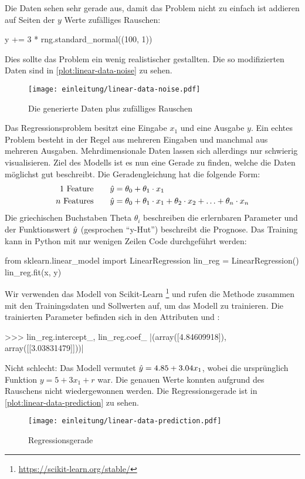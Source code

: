 \noindent
Die Daten sehen sehr gerade aus, damit das Problem nicht zu einfach ist
addieren auf Seiten der $y$ Werte zufälliges Rauschen:
\begin{pythoncode}
y += 3 * rng.standard_normal((100, 1))
\end{pythoncode}
Dies sollte das Problem ein wenig realistischer gestallten.
Die so modifizierten Daten sind in \autoref{plot:linear-data-noise} zu sehen.
\newpage
\begin{figure}[!h]
  \centering
  \texttt{[image: einleitung/linear-data-noise.pdf]}
  \caption{Die generierte Daten plus zufälliges Rauschen}
  \label{plot:linear-data-noise}
\end{figure}
\noindent
Das Regressionsproblem besitzt eine Eingabe $x_1$ und eine Ausgabe $y$.
Ein echtes Problem besteht in der Regel aus mehreren Eingaben und manchmal
aus mehreren Ausgaben. Mehrdimensionale Daten lassen sich allerdings nur schwierig
visualisieren. Ziel des Modells ist es nun eine Gerade zu finden, welche die
Daten möglichst gut beschreibt. Die Geradengleichung hat die folgende Form:
\begin{align}
  \text{1 Feature}\qquad    & \hat{y} = \theta_0 + \theta_1 \cdot x_1   \\
  \text{$n$ Features}\qquad & \hat{y} = \theta_0 + \theta_1 \cdot x_1 +
  \theta_2 \cdot x_2 + \ldots + \theta_n \cdot x_n
\end{align}
Die griechischen Buchstaben Theta $\theta_i$ beschreiben die erlernbaren Parameter und
der Funktionswert $\hat{y}$ (gesprochen \enquote{y-Hut}) beschreibt die Prognose.
Das Training kann in Python mit nur wenigen Zeilen Code durchgeführt werden:
\begin{pythoncode}
from sklearn.linear_model import LinearRegression
lin_reg = LinearRegression()
lin_reg.fit(x, y)
\end{pythoncode}
Wir verwenden das  Modell von Scikit-Learn
\footnote{\url{https://scikit-learn.org/stable/}} und rufen die 
Methode zusammen mit den Trainingsdaten und Sollwerten auf, um das Modell zu trainieren.
Die trainierten Parameter befinden sich in den Attributen 
und :
\begin{pythoncode}
>>> lin_reg.intercept_, lin_reg.coef_
|(array([4.84609918]), array([[3.03831479]]))|
\end{pythoncode}
Nicht schlecht: Das Modell vermutet $\hat{y} = 4.85 + 3.04x_1$, wobei die ursprünglich
Funktion $y = 5 + 3x_1 + r$ war. Die genauen Werte konnten aufgrund des Rauschens
nicht wiedergewonnen werden. Die Regressionsgerade ist
in \autoref{plot:linear-data-prediction} zu sehen.
\begin{figure}[!h]
  \centering
  \texttt{[image: einleitung/linear-data-prediction.pdf]}
  \caption{Regressionsgerade}
  \label{plot:linear-data-prediction}
\end{figure}

